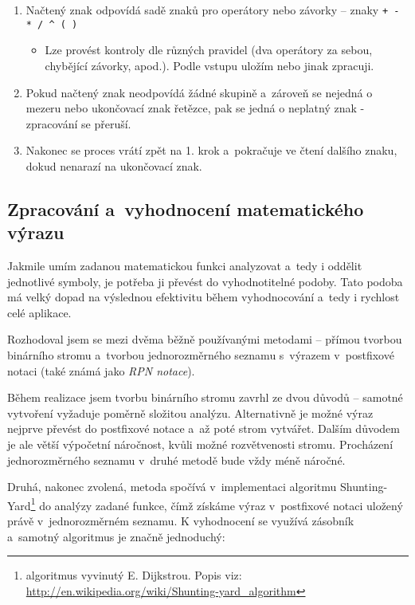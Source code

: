 \documentclass[pdftex,a4paper]{article}
\begin{document}
\begin{enumerate}
\item Načtený znak odpovídá sadě znaků pro operátory nebo závorky -- znaky \texttt{+ - * / \^{} ( )}
\begin{itemize}
\item Lze provést kontroly dle různých pravidel (dva operátory za sebou, chybějící závorky, apod.). Podle vstupu uložím nebo jinak zpracuji.
\end{itemize}

\item Pokud načtený znak neodpovídá žádné skupině a~zároveň se nejedná o mezeru nebo ukončovací znak řetězce, pak se jedná o neplatný znak - zpracování se přeruší.

\item Nakonec se proces vrátí zpět na 1. krok a~pokračuje ve čtení dalšího znaku, dokud nenarazí na ukončovací znak.

\end{enumerate}


\subsection{Zpracování a~vyhodnocení matematického výrazu}\label{subsect:zprac-vyhodn}
Jakmile umím zadanou matematickou funkci analyzovat a~tedy i oddělit jednotlivé symboly, je potřeba ji převést do vyhodnotitelné podoby. Tato podoba má velký dopad na výslednou efektivitu během vyhodnocování a~tedy i rychlost celé aplikace. 

Rozhodoval jsem se mezi dvěma běžně používanými metodami -- přímou tvorbou binárního stromu a~tvorbou jednorozměrného seznamu s~výrazem v~postfixové notaci (také známá jako \textit{RPN notace}). 

Během realizace jsem tvorbu binárního stromu zavrhl ze dvou důvodů -- samotné vytvoření vyžaduje poměrně složitou analýzu. Alternativně je možné výraz nejprve převést do postfixové notace a~až poté strom vytvářet. Dalším důvodem je ale větší výpočetní náročnost, kvůli možné rozvětvenosti stromu. Procházení jednorozměrného  seznamu v~druhé metodě bude vždy méně náročné.

Druhá, nakonec zvolená, metoda spočívá v~implementaci algoritmu Shunting-Yard\footnote{algoritmus vyvinutý E. Dijkstrou. Popis viz: \url{http://en.wikipedia.org/wiki/Shunting-yard_algorithm}} do analýzy zadané funkce, čímž získáme výraz v~postfixové notaci uložený právě v~jednorozměrném seznamu. K vyhodnocení se využívá zásobník a~samotný algoritmus je značně jednoduchý:  
\end{document}
